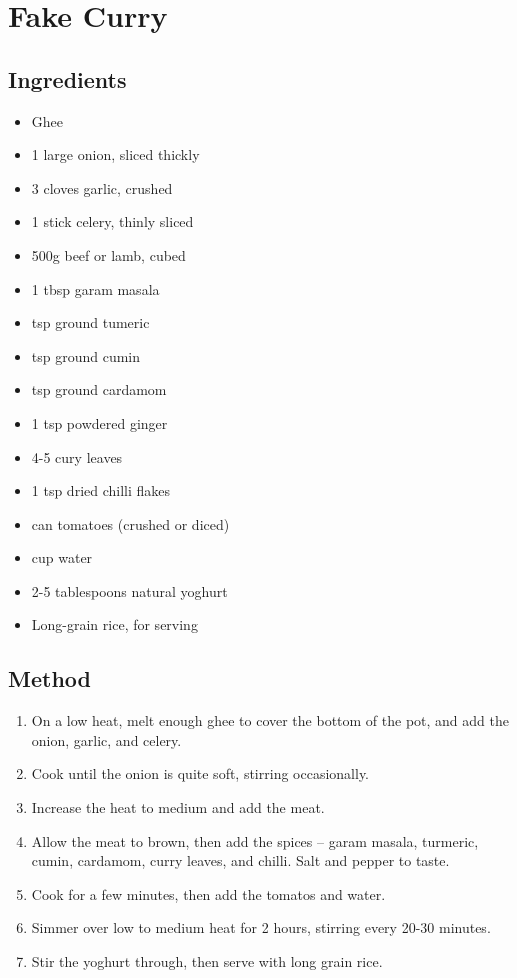 \section{Fake Curry}


  \begin{multicols}{2}
    \subsection{Ingredients}
      \begin{itemize}
        \item Ghee
        \item 1 large onion, sliced thickly
        \item 3 cloves garlic, crushed
        \item 1 stick celery, thinly sliced
        \item 500g beef or lamb, cubed
        \item 1 tbsp garam masala
        \item {} tsp ground tumeric
        \item {} tsp ground cumin
        \item {} tsp ground cardamom
        \item 1 tsp powdered ginger
        \item 4-5 cury leaves
        \item 1 tsp dried chilli flakes
        \item {} can tomatoes (crushed or diced)
        \item {} cup water
        \item 2-5 tablespoons natural yoghurt
        \item Long-grain rice, for serving
      \end{itemize}
  \vfill\null
  \columnbreak
  \subsection{Method}
    \begin{enumerate}
      \item On a low heat, melt enough ghee to cover the bottom of the pot, and add the onion, garlic, and celery.
      \item Cook until the onion is quite soft, stirring occasionally.
      \item Increase the heat to medium and add the meat.
      \item Allow the meat to brown, then add the spices -- garam masala, turmeric, cumin, cardamom, curry leaves, and chilli. Salt and pepper to taste.
      \item Cook for a few minutes, then add the tomatos and water.
      \item Simmer over low to medium heat for 2 hours, stirring every 20-30 minutes.
      \item Stir the yoghurt through, then serve with long grain rice.
    \end{enumerate}
  \end{multicols}

